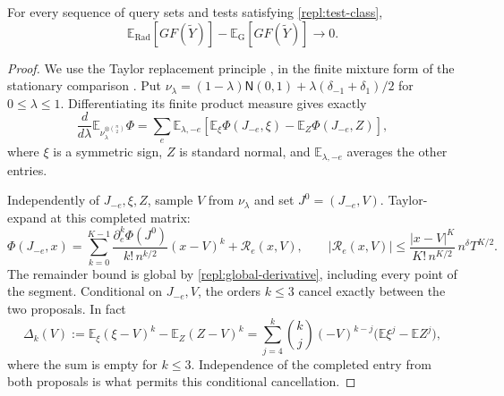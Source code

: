 \begin{lemma}\label{repl:comparison}
For every sequence of query sets and tests satisfying
\eqref{repl:test-class},
\[
 \mathbb E_{\mathrm{Rad}}\!\left[G F(\widetilde Y)\right]
 -\mathbb E_{\mathrm{G}}\!\left[G F(\widetilde Y)\right]\longrightarrow0 .
\]
\end{lemma}

\begin{proof}
We use the Taylor replacement principle \cite{Chatterjee2006}, in the finite
mixture form of the stationary comparison \cite[Section~8]{FUA}.
Put
$\nu_\lambda=(1-\lambda)\mathsf N(0,1)
 +\lambda(\delta_{-1}+\delta_1)/2$ for $0\le\lambda\le1$.
Differentiating its finite product measure gives exactly
\begin{equation}\label{repl:mixture-derivative}
 \frac d{d\lambda}\mathbb E_{\nu_\lambda^{\otimes\binom n2}}\Phi
 =\sum_e\mathbb E_{\lambda,-e}
    \left[\mathbb E_\xi\Phi(J_{-e},\xi)
                 -\mathbb E_Z\Phi(J_{-e},Z)\right],
\end{equation}
where $\xi$ is a symmetric sign, $Z$ is standard normal, and
$\mathbb E_{\lambda,-e}$ averages the other entries.

Independently of $J_{-e},\xi,Z$, sample $V$ from $\nu_\lambda$ and set
$J^0=(J_{-e},V)$.  Taylor-expand at this completed matrix:
\begin{equation}\label{repl:centered-taylor}
 \Phi(J_{-e},x)=
 \sum_{k=0}^{K-1}
   \frac{\partial_e^k\Phi(J^0)}{k!\,n^{k/2}}(x-V)^k
       +\mathcal R_e(x,V),
 \qquad
 |\mathcal R_e(x,V)|
 \le\frac{|x-V|^K}{K!\,n^{K/2}}\,n^\delta T^{K/2}.
\end{equation}
The remainder bound is global by \eqref{repl:global-derivative}, including
every point of the segment.  Conditional on $J_{-e},V$, the orders
$k\le3$ cancel exactly between the two proposals.  In fact
\begin{equation}\label{repl:centered-moments}
 \Delta_k(V):=\mathbb E_\xi(\xi-V)^k-\mathbb E_Z(Z-V)^k
 =\sum_{j=4}^k\binom kj(-V)^{k-j}
      \bigl(\mathbb E\xi^j-\mathbb EZ^j\bigr),
\end{equation}
where the sum is empty for $k\le3$.  Independence of the completed entry
from both proposals is what permits this conditional cancellation.


\end{proof}
